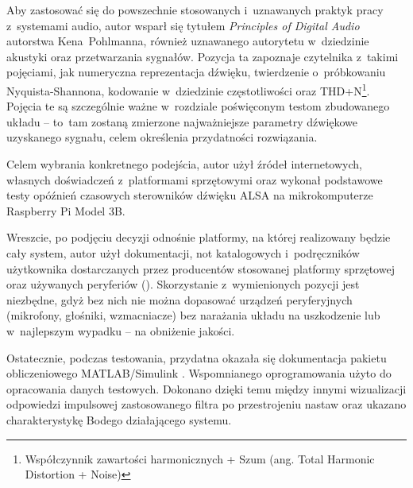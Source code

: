 Aby zastosować się do powszechnie stosowanych i~uznawanych praktyk pracy z~systemami audio, autor wsparł się tytułem \textit{Principles of Digital Audio} \cite{Pohlmann2010} autorstwa Kena~Pohlmanna, również uznawanego autorytetu w~dziedzinie akustyki oraz przetwarzania sygnałów. Pozycja ta zapoznaje czytelnika z~takimi pojęciami, jak numeryczna reprezentacja d\'zwięku, twierdzenie o~próbkowaniu Nyquista-Shannona, kodowanie w~dziedzinie częstotliwości oraz THD+N\footnote{Współczynnik zawartości harmonicznych + Szum	(ang. Total Harmonic Distortion + Noise)}. Pojęcia te są szczególnie ważne w~rozdziale poświęconym testom zbudowanego układu -- to~tam zostaną zmierzone najważniejsze parametry d\'zwiękowe uzyskanego sygnału, celem określenia przydatności rozwiązania.

Celem wybrania konkretnego podejścia, autor użył źródeł internetowych, własnych doświadczeń z~platformami sprzętowymi oraz wykonał podstawowe testy opóźnień czasowych sterowników dźwięku ALSA na mikrokomputerze Raspberry Pi Model 3B.

Wreszcie, po podjęciu decyzji odnośnie platformy, na której realizowany będzie cały system, autor użył dokumentacji, not katalogowych i~podręczników użytkownika dostarczanych przez producentów stosowanej platformy sprzętowej oraz używanych peryferiów (\cite{speakeropamp, RM0390}). Skorzystanie z~wymienionych pozycji jest niezbędne, gdyż bez nich nie można dopasować urządzeń peryferyjnych (mikrofony, głośniki, wzmacniacze) bez narażania układu na uszkodzenie lub w~najlepszym wypadku -- na obniżenie jakości.

Ostatecznie, podczas testowania, przydatna okazała się dokumentacja pakietu obliczeniowego MATLAB/Simulink \cite{Matlab}. Wspomnianego oprogramowania użyto do opracowania danych testowych. Dokonano dzięki temu między innymi wizualizacji odpowiedzi impulsowej zastosowanego filtra po przestrojeniu nastaw oraz ukazano charakterystykę Bodego działającego systemu.